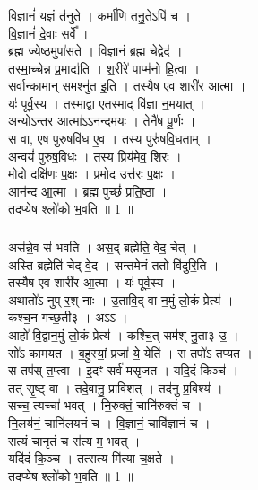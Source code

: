 \subsubsection{}
वि॒ज्ञानं॑ य॒ज्ञं त॑नुते । कर्मा॑णि तनु॒तेऽपि॑ च ।\\
वि॒ज्ञानं॑ दे॒वाः सर्वे᳚ ।\\
ब्रह्म॒ ज्येष्ठ॒मुपा॑सते । वि॒ज्ञानं॒ ब्रह्म॒ चेद्वेद॑ ।\\
तस्मा॒च्चेन्न प्र॒माद्य॑ति । श॒रीरे॑ पाप्म॑नो हि॒त्वा ।\\
सर्वान्कामान् समश्नु॑त इ॒ति । तस्यैष एव शारी॑र आ॒त्मा ।\\
यः॑ पूर्व॒स्य । तस्माद्वा एतस्माद् वि॑ज्ञा न॒मयात् ।\\
अन्योऽन्तर आत्मा॑ऽऽनन्द॒मयः । तेनै॑ष पू॒र्णः ।\\
स वा, एष पुरुषवि॑ध ए॒व । तस्य पुरु॑षवि॒धताम् ।\\
अन्वयं॑ पुरुष॒विधः । तस्य प्रिय॑मेव॒ शिरः ।\\
मोदो दक्षि॑णः प॒क्षः । प्रमोद उत्त॑रः प॒क्षः । \\
आन॑न्द आ॒त्मा । ब्रह्म पुच्छं॑ प्रति॒ष्ठा ।\\
तदप्येष श्लो॑को भ॒वति ॥ 1 ॥\\
\subsubsection{}
अस॑न्ने॒व स॑ भवति । अस॒द् ब्रह्मेति॒ वेद॒ चेत् ।\\
अस्ति ब्रह्मेति॑ चेद् वे॒द । सन्तमेनं ततो वि॑दुरि॒ति ।\\
तस्यैष एव शारी॑र आ॒त्मा । यः॑ पूर्व॒स्य ।\\
अथातो॑ऽ नुप् र॒श् नाः । उ॒तावि॒द् वा न॒मुं लो॒कं प्रेत्य॑ ।\\
कश्च॒न ग॑च्छ॒ती३ । अऽऽ ।\\
आहो॑ वि॒द्वान॒मुं लो॒कं प्रेत्य॑ । कश्चि॒त् सम॑श् नु॒ता३ उ॒ ।\\
सो॑ऽ कामयत । ब॒हुस्यां॒ प्रजा॑ ये॒ येति॑ । स तपो॑ऽ तप्यत ।\\
स तप॑स् त॒प्त्वा । इ॒दꣳ सर्व॑ मसृजत । यदि॒दं किञ्च॑ ।\\
तत् सृ॒ष्ट् वा । तदे॒वानु॒ प्रावि॑शत् । तद॑नु प्र॒विश्य॑ ।\\
सच्च॒ त्यच्चा॑ भवत् । नि॒रुक्तं॒ चानि॑रुक्तं च । \\
नि॒लय॑नं॒ चानि॑लयनं च । वि॒ज्ञानं॒ चावि॑ज्ञानं च । \\
सत्यं चानृतं च स॑त्य म॒ भवत् । \\
यदि॑दं कि॒ञ्च । तत्सत्य मि॑त्या च॒क्षते ।\\
तदप्येष श्लो॑को भ॒वति ॥ 1 ॥\\
